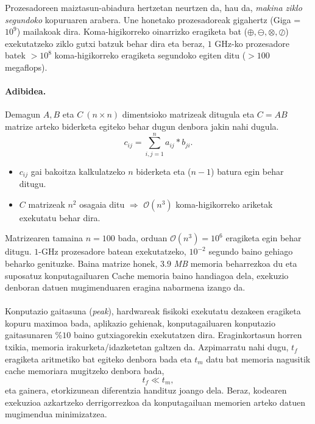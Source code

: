 Prozesadoreen maiztasun-abiadura hertzetan neurtzen da, hau da,  \emph{makina ziklo segundoko} kopuruaren arabera. Une honetako prozesadoreak gigahertz (Giga = $10^9$) mailakoak dira. Koma-higikorreko oinarrizko eragiketa bat ($\oplus,\ominus,\otimes,\oslash$) exekutatzeko  ziklo gutxi batzuk behar dira eta beraz, $1$ GHz-ko prozesadore batek
$>10^8$ koma-higikorreko eragiketa segundoko egiten ditu ($>100$ megaflops).

\paragraph*{\textbf{Adibidea}.} 
Demagun $A,B$ eta $C \ (n \times n)$ dimentsioko matrizeak ditugula eta $C=AB$ matrize arteko biderketa egiteko behar dugun denbora jakin nahi dugula.
\begin{equation*}
c_{ij}=\sum\limits_{i,j=1}^{n} a_{ij}*b_{ji}.
\end{equation*}

\begin{itemize}
\item $c_{ij}$ gai bakoitza kalkulatzeko $n$ biderketa eta ($n-1$) batura egin behar ditugu.
\item $C$ matrizeak $n^2$ osagaia ditu $\Rightarrow$ $\mathcal{O}(n^3)$ koma-higikorreko ariketak exekutatu behar dira.
\end{itemize}

Matrizearen tamaina $n=100$ bada,  orduan  $\mathcal{O}(n^3)=10^{6}$ eragiketa egin behar ditugu. $1$-GHz prozesadore batean exekutatzeko, $10^{-2}$ segundo baino gehiago beharko genituzke. Baina matrize honek,  $3.9$ \emph{MB} memoria beharrezkoa du eta suposatuz konputagailuaren Cache memoria baino handiagoa dela, exekuzio denboran datuen mugimenduaren eragina nabarmena izango da. 

\paragraph*{}Konputazio gaitasuna (\emph{peak}), hardwareak fisikoki exekutatu dezakeen eragiketa kopuru maximoa bada, aplikazio gehienak, konputagailuaren konputazio gaitasunaren  $\%10$ baino gutxiagorekin exekutatzen dira.  Eraginkortasun horren txikia, memoria irakurketa/idazketetan galtzen da. Azpimarratu nahi dugu, $t_f$ eragiketa aritmetiko bat egiteko denbora bada eta $t_m$ datu bat memoria nagusitik cache memoriara mugitzeko denbora bada,
\begin{equation*}
 t_f \ll t_m,
\end{equation*}
eta gainera, etorkizunean diferentzia handituz joango dela. Beraz, kodearen exekuzioa azkartzeko derrigorrezkoa da konputagailuan memorien arteko datuen mugimendua minimizatzea.
       

